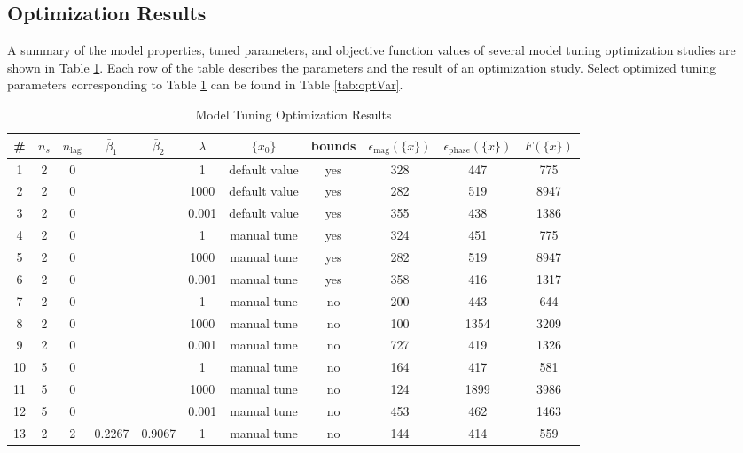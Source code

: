 \subsection{Optimization Results} %

A summary of the model properties, tuned parameters, and objective function values of several model tuning optimization studies are shown in Table \ref{tab:optResult}. Each row of the table describes the parameters and the result of an optimization study. Select optimized tuning parameters corresponding to Table \ref{tab:optResult} can be found in Table \ref{tab:optVar}.

\begin{landscape}

\begin{table}[h]
	\centering
	\caption{Model Tuning Optimization Results}
	\label{tab:optResult}
	\begin{tabular}{ccccccccccc}
		\hline\hline
		\# & $n_s$ & $n_\text{lag}$ & $\bar{\beta}_1$ & $\bar{\beta}_2$ & $\lambda$ & $\{x_0\}$ & bounds & $\epsilon_\text{mag}(\{x\})$ & $\epsilon_\text{phase}(\{x\})$ & $F(\{x\})$ \\
		\hline
		1  & 2 & 0 & & & 1    & default value & yes & 328 & 447  & 775 \\
		2  & 2 & 0 & & & 1000  & default value & yes & 282 & 519  & 8947 \\
		3  & 2 & 0 & & & 0.001 & default value & yes & 355 & 438  & 1386 \\
		4  & 2 & 0 & & & 1    & manual tune   & yes & 324 & 451  & 775 \\
		5  & 2 & 0 & & & 1000  & manual tune   & yes & 282 & 519  & 8947 \\
		6  & 2 & 0 & & & 0.001 & manual tune   & yes & 358 & 416  & 1317 \\
		7  & 2 & 0 & & & 1    & manual tune   & no  & 200 & 443  & 644 \\
		8  & 2 & 0 & & & 1000  & manual tune   & no  & 100 & 1354 & 3209 \\
		9  & 2 & 0 & & & 0.001 & manual tune   & no  & 727 & 419  & 1326 \\
		10 & 5 & 0 & & & 1    & manual tune   & no  & 164 & 417  & 581 \\
		11 & 5 & 0 & & & 1000  & manual tune   & no  & 124 & 1899 & 3986 \\
		12 & 5 & 0 & & & 0.001 & manual tune   & no  & 453 & 462  & 1463 \\
		13 & 2 & 2 & 0.2267 & 0.9067 & 1    & manual tune   & no  & 144 & 414  & 559 \\

\end{tabular}
\end{table}
\end{landscape}
